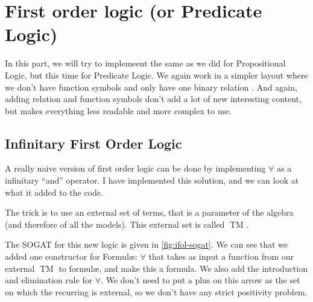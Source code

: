 \documentclass[10pt,a4paper]{article}
\begin{document}
	\section{First order logic (or Predicate Logic)}
	
		In this part, we will try to implemeent the same as we did for Propositional Logic, but this time for Predicate Logic. We again work in a simpler layout where we don't have function symbols and only have one binary relation . And again, adding relation and function symbols don't add a lot of new interesting content, but makes everything less readable and more complex to use.
		
		\subsection{Infinitary First Order Logic}
		
			A really naive version of first order logic can be done by implementing $\forall$ as a infinitary \enquote{and} operator. I have implemented this solution, and we can look at what it added to the code.
		
			The trick is to use an external set of terms, that is a parameter of the algebra (and therefore of all the models). This external set is called $\operatorname{TM}$.
			
			The SOGAT for this new logic is given in \autoref{fig:ifol-sogat}. We can see that we added one constructor for Formulæ: $\forall$ that takes as input a function from our external $\operatorname{TM}$ to formulæ, and make this a formula. We also add the introduction and elimination rule for $\forall$. We don't need to put a plus on this arrow as the set on which the recurring is external, so we don't have any strict positivity problem.
			
\end{document}
